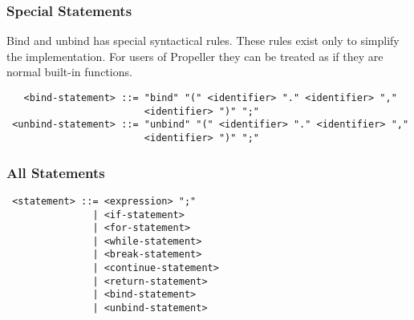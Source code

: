 \subsubsection{Special Statements}

Bind and unbind has special syntactical rules. These rules exist only to simplify the
implementation. For users of Propeller they can be treated as if they are normal
built-in functions.

\begin{verbatim}
   <bind-statement> ::= "bind" "(" <identifier> "." <identifier> ","
                        <identifier> ")" ";"
 <unbind-statement> ::= "unbind" "(" <identifier> "." <identifier> ","
                        <identifier> ")" ";"
\end{verbatim}

\subsubsection{All Statements}

\begin{verbatim}
 <statement> ::= <expression> ";"
               | <if-statement>
               | <for-statement>
               | <while-statement>
               | <break-statement>
               | <continue-statement>
               | <return-statement>
               | <bind-statement>
               | <unbind-statement>
\end{verbatim}


